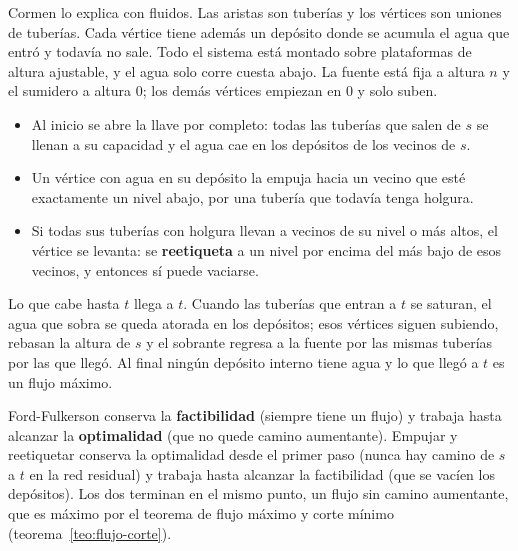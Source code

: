 \documentclass[11pt,letterpaper]{article}
\begin{document}
Cormen lo explica con fluidos. Las aristas son tuberías y los vértices
son uniones de tuberías. Cada vértice tiene además un depósito donde
se acumula el agua que entró y todavía no sale. Todo el sistema está
montado sobre plataformas de altura ajustable, y el agua solo corre
cuesta abajo. La fuente está fija a altura $n$ y el sumidero a altura
$0$; los demás vértices empiezan en $0$ y solo suben.

\begin{itemize}
  \item Al inicio se abre la llave por completo: todas las tuberías que
        salen de $s$ se llenan a su capacidad y el agua cae en los
        depósitos de los vecinos de $s$.
  \item Un vértice con agua en su depósito la empuja hacia un vecino
        que esté exactamente un nivel abajo, por una tubería que
        todavía tenga holgura.
  \item Si todas sus tuberías con holgura llevan a vecinos de su nivel
        o más altos, el vértice se levanta: se \textbf{reetiqueta} a un
        nivel por encima del más bajo de esos vecinos, y entonces sí
        puede vaciarse.
\end{itemize}

Lo que cabe hasta $t$ llega a $t$. Cuando las tuberías que entran a
$t$ se saturan, el agua que sobra se queda atorada en los depósitos;
esos vértices siguen subiendo, rebasan la altura de $s$ y el sobrante
regresa a la fuente por las mismas tuberías por las que llegó. Al
final ningún depósito interno tiene agua y lo que llegó a $t$ es un
flujo máximo.

\begin{idea}
  Ford-Fulkerson conserva la \textbf{factibilidad} (siempre tiene un
  flujo) y trabaja hasta alcanzar la \textbf{optimalidad} (que no
  quede camino aumentante). Empujar y reetiquetar conserva la
  optimalidad desde el primer paso (nunca hay camino de $s$ a $t$ en
  la red residual) y trabaja hasta alcanzar la factibilidad (que se
  vacíen los depósitos). Los dos terminan en el mismo punto, un flujo
  sin camino aumentante, que es máximo por el teorema de flujo máximo
  y corte mínimo (teorema~\ref{teo:flujo-corte}).
\end{idea}
\end{document}
